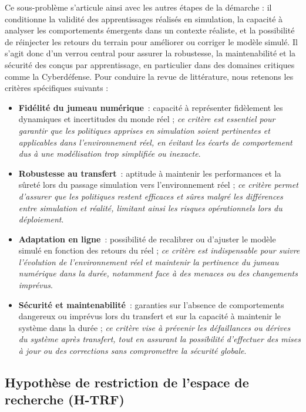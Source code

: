 Ce sous-problème s'articule ainsi avec les autres étapes de la démarche : il conditionne la validité des apprentissages réalisés en simulation, la capacité à analyser les comportements émergents dans un contexte réaliste, et la possibilité de réinjecter les retours du terrain pour améliorer ou corriger le modèle simulé. Il s'agit donc d'un verrou central pour assurer la robustesse, la maintenabilité et la sécurité des  conçus par apprentissage, en particulier dans des domaines critiques comme la Cyberdéfense.
Pour conduire la revue de littérature, nous retenons les critères spécifiques suivants :
%
\begin{itemize}
  \item \textbf{Fidélité du jumeau numérique}~: capacité à représenter fidèlement les dynamiques et incertitudes du monde réel ; \emph{ce critère est essentiel pour garantir que les politiques apprises en simulation soient pertinentes et applicables dans l'environnement réel, en évitant les écarts de comportement dus à une modélisation trop simplifiée ou inexacte}.
  \item \textbf{Robustesse au transfert}~: aptitude à maintenir les performances et la sûreté lors du passage simulation vers l'environnement réel ; \emph{ce critère permet d'assurer que les politiques restent efficaces et sûres malgré les différences entre simulation et réalité, limitant ainsi les risques opérationnels lors du déploiement}.
  \item \textbf{Adaptation en ligne}~: possibilité de recalibrer ou d'ajuster le modèle simulé en fonction des retours du réel ; \emph{ce critère est indispensable pour suivre l'évolution de l'environnement réel et maintenir la pertinence du jumeau numérique dans la durée, notamment face à des menaces ou des changements imprévus}.
  \item \textbf{Sécurité et maintenabilité}~: garanties sur l'absence de comportements dangereux ou imprévus lors du transfert et sur la capacité à maintenir le système dans la durée ; \emph{ce critère vise à prévenir les défaillances ou dérives du système après transfert, tout en assurant la possibilité d'effectuer des mises à jour ou des corrections sans compromettre la sécurité globale}.
\end{itemize}


\subsection*{Hypothèse de restriction de l'espace de recherche (\textbf{H-TRF})}

